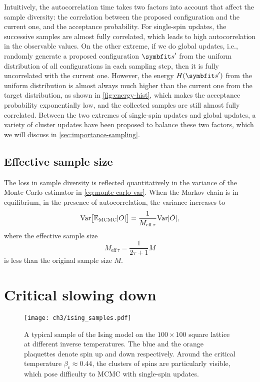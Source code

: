 Intuitively, the autocorrelation time takes two factors into account that affect the sample diversity: the correlation between the proposed configuration and the current one, and the acceptance probability. For single-spin updates, the successive samples are almost fully correlated, which leads to high autocorrelation in the observable values. On the other extreme, if we do global updates, i.e., randomly generate a proposed configuration $\vs'$ from the uniform distribution of all configurations in each sampling step, then it is fully uncorrelated with the current one. However, the energy $H(\vs')$ from the uniform distribution is almost always much higher than the current one from the target distribution, as shown in \cref{fig:energy-hist}, which makes the acceptance probability exponentially low, and the collected samples are still almost fully correlated. Between the two extremes of single-spin updates and global updates, a variety of cluster updates have been proposed to balance these two factors, which we will discuss in \cref{sec:importance-sampling}.

\subsection{Effective sample size}

The loss in sample diversity is reflected quantitatively in the variance of the Monte Carlo estimator in \cref{eq:monte-carlo-var}. When the Markov chain is in equilibrium, in the presence of autocorrelation, the variance increases to
\begin{equation}
\mathrm{Var}\big[ \mathbb{E}_\text{MCMC}[O] \big] = \frac{1}{M_{\text{eff}\,\tau}} \mathrm{Var}[\bar{O}],
\end{equation}
where the effective sample size
\begin{equation}
M_{\text{eff}\,\tau} = \frac{1}{2 \tau + 1} M
\end{equation}
is less than the original sample size $M$.

\section{Critical slowing down}

\begin{figure}[htb]
\centering
\texttt{[image: ch3/ising\_samples.pdf]}
\caption[Sample of Ising model at different temperatures]{
A typical sample of the Ising model on the $100 \times 100$ square lattice at different inverse temperatures. The blue and the orange plaquettes denote spin up and down respectively. Around the critical temperature $\beta_\text{c} \approx 0.44$, the clusters of spins are particularly visible, which pose difficulty to MCMC with single-spin updates.
}
\label{fig:ising-samples}
\end{figure}

